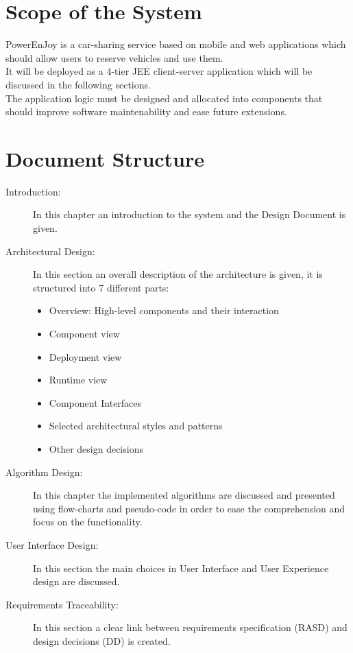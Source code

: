 \section{Scope of the System}
PowerEnJoy is a car-sharing service based on mobile and web applications which should allow users to reserve vehicles and use them.
\\It will be deployed as a 4-tier JEE client-server application which will be discussed in the following sections.
\\The application logic must be designed and allocated into components that should improve software maintenability and ease future extensions.
\section{Document Structure}
\begin{description} 
	\item[Introduction: ] In this chapter an introduction to the system and the Design Document is given.
	\item[Architectural Design: ] In this section an overall description of the architecture is given, it is structured into 7 different parts: 
		\begin{itemize}
			\item Overview: High-level components and their interaction
			\item Component view
			\item Deployment view
			\item Runtime view
			\item Component Interfaces
			\item Selected architectural styles and patterns
			\item Other design decisions
		\end{itemize}
	\item[Algorithm Design: ] In this chapter the implemented algorithms are discussed and presented using flow-charts and pseudo-code in order to ease the comprehension and focus on the functionality.
	\item[User Interface Design: ] In this section the main choices in User Interface and User Experience design are discussed.
	\item[Requirements Traceability: ] In this section a clear link between requirements specification (RASD) and design decisions (DD) is created.
\end{description}